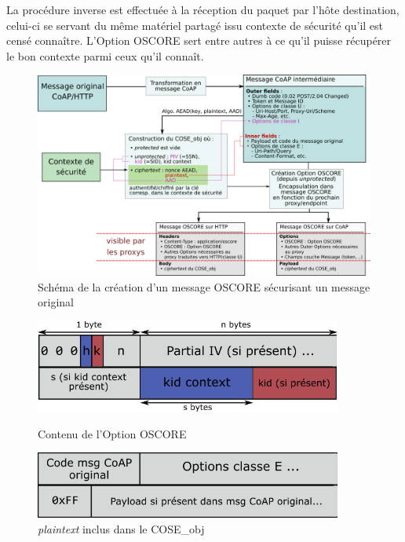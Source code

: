 \documentclass[]{report}
\begin{document}
\vspace{0.2cm}

La procédure inverse est effectuée à la réception du paquet par l'hôte destination, celui-ci se servant du même matériel partagé issu contexte de sécurité qu'il est censé connaître. L'Option OSCORE sert entre autres à ce qu'il puisse récupérer le bon contexte parmi ceux qu'il connaît.

\vspace{0.5cm}

	\begin{figure}[!hb]
	\centering
	\includegraphics[width=0.85\linewidth]{OSCORE_scheme}
	\caption{Schéma de la création d'un message OSCORE sécurisant un message original}
	\label{fig:OSCORE_scheme}
	\end{figure}
	
\newpage

\begin{figure}[!ht]
	
	\begin{minipage}{0.5\textwidth}
        \centering
		\includegraphics[width=0.9\textwidth]{OSCORE_option}
		\caption{Contenu de l'Option OSCORE}
		\label{fig:OSCORE_option}
	\end{minipage}\hfill
	\begin{minipage}{0.5\textwidth}
        \centering
        
		\includegraphics[width=0.9\textwidth]{OSCORE_plaintext}
		\caption{\textit{plaintext} inclus dans le COSE\_obj}
		\label{fig:OSCORE_plaintext}
	\end{minipage}	
\end{figure}
\end{document}
